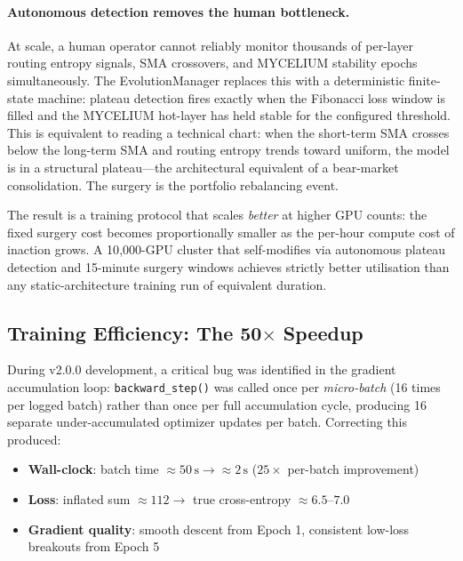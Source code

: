 \documentclass[11pt,a4paper]{article}
\begin{document}
\paragraph{Autonomous detection removes the human bottleneck.}
At scale, a human operator cannot reliably monitor thousands of per-layer
routing entropy signals, SMA crossovers, and MYCELIUM stability epochs
simultaneously. The EvolutionManager replaces this with a deterministic
finite-state machine: plateau detection fires exactly when the Fibonacci loss
window is filled and the MYCELIUM hot-layer has held stable for the configured
threshold. This is equivalent to reading a technical chart: when the short-term
SMA crosses below the long-term SMA and routing entropy trends toward uniform,
the model is in a structural plateau---the architectural equivalent of a
bear-market consolidation. The surgery is the portfolio rebalancing event.

The result is a training protocol that scales \emph{better} at higher GPU
counts: the fixed surgery cost becomes proportionally smaller as the per-hour
compute cost of inaction grows. A 10{,}000-GPU cluster that self-modifies via
autonomous plateau detection and 15-minute surgery windows achieves strictly
better utilisation than any static-architecture training run of equivalent
duration.

\subsection{Training Efficiency: The 50$\times$ Speedup}

During v2.0.0 development, a critical bug was identified in the gradient
accumulation loop: \texttt{backward\_step()} was called once per \emph{micro-batch}
(16 times per logged batch) rather than once per full accumulation cycle, producing
16 separate under-accumulated optimizer updates per batch. Correcting this produced:

\begin{itemize}
  \item \textbf{Wall-clock}: batch time $\approx 50\,\text{s} \to \approx 2\,\text{s}$
        ($25\times$ per-batch improvement)
  \item \textbf{Loss}: inflated sum $\approx 112 \to$ true cross-entropy
        $\approx 6.5$--$7.0$
  \item \textbf{Gradient quality}: smooth descent from Epoch 1, consistent
        low-loss breakouts from Epoch 5
\end{itemize}
\end{document}
